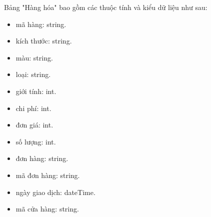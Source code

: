 Bảng "Hàng hóa" bao gồm các thuộc tính và kiểu dữ liệu như sau:
\begin{itemize}
	\item mã hàng: string.
	\item kích thước: string.
	\item màu: string.
	\item loại: string.
	\item giới tính: int.
	\item chi phí: int.
	\item đơn giá: int.
	\item số lượng: int.
	\item đơn hàng: string.
\end{itemize}

\begin{itemize}
	\item mã đơn hàng: string.
	\item ngày giao dịch: dateTime.
	\item mã cửa hàng: string.
\end{itemize}
